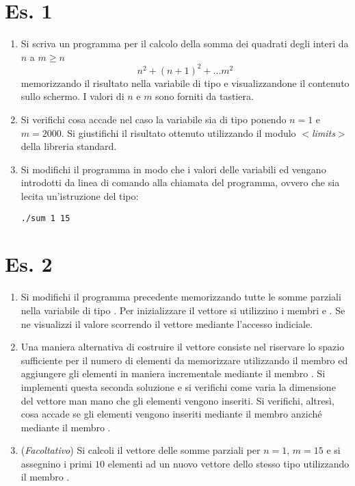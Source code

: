 \section*{Es. 1}
\begin{enumerate}
\item Si scriva un programma per il calcolo della somma dei quadrati
  degli interi da $n$ a $m\ge n$ 
\begin{equation*}
n^2 + \left(n+1\right)^2 + \ldots m^2
\end{equation*}
memorizzando il risultato nella variabile  di tipo
 e visualizzandone il contenuto sullo schermo. I valori di
$n$ e $m$ sono forniti da tastiera. 
\item Si verifichi cosa accade nel caso la variabile  sia di
  tipo  ponendo $n=1$ e $m=2000$. Si giustifichi il risultato
  ottenuto utilizzando il modulo \emph{$<$limits$>$} della libreria
  standard. 
\item Si modifichi il programma in modo che i valori delle variabili
   ed  vengano introdotti da linea di comando alla
  chiamata del programma, ovvero che sia lecita un'istruzione del
  tipo: 
\begin{verbatim}
./sum 1 15
\end{verbatim}
\end{enumerate}

\section*{Es. 2}
\begin{enumerate}
\item Si modifichi il programma precedente memorizzando tutte le somme
  parziali nella variabile  di tipo
  . Per inizializzare il vettore si
  utilizzino i membri  e . Se ne
  visualizzi il valore scorrendo il vettore mediante l'accesso
  indiciale. 
\item Una maniera alternativa di costruire il vettore 
  consiste nel riservare lo spazio sufficiente per il numero di
  elementi da memorizzare utilizzando il membro  ed
  aggiungere gli elementi in maniera incrementale mediante il membro
  . Si implementi questa seconda soluzione e si
  verifichi come varia la dimensione del vettore man mano che gli
  elementi vengono inseriti. Si verifichi, altres\`i, cosa accade se
  gli elementi vengono inseriti mediante il membro 
  anzich\'e mediante il membro . 
\item (\emph{Facoltativo}) Si calcoli il vettore delle somme parziali
  per $n=1$, $m=15$ e si assegnino i primi $10$ elementi ad un nuovo
  vettore  dello stesso tipo utilizzando il membro
  . 
\end{enumerate}
